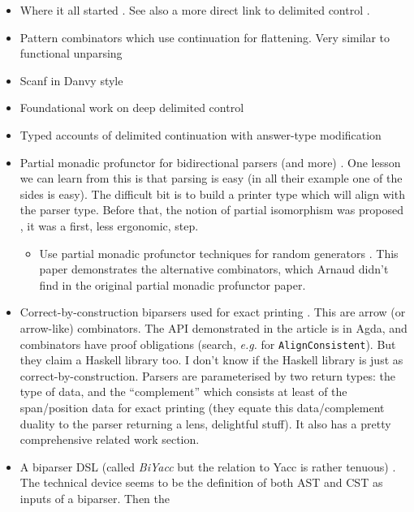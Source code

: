 \documentclass[sigplan,review,dvipsnames,screen,10pt]{acmart}
\begin{document}
\begin{itemize}
\item Where it all started \cite{functional-unparsing}. See also a
  more direct link to delimited control
  \cite{typed-functional-unparsing}.
\item Pattern combinators which use continuation for flattening. Very
  similar to functional unparsing \cite{pattern-combinators}
\item Scanf in Danvy style \cite{functional-ununparsing}
\item Foundational work on deep delimited control \cite{shift0}
\item Typed accounts of delimited continuation with answer-type
  modification \cite{polymorphic-conts,substructural-delimcc}
\item Partial monadic profunctor for bidirectional parsers (and more)
  \cite{monadic-profunctors}. One lesson we can learn from this is
  that parsing is easy (in all their example one of the sides is
  easy). The difficult bit is to build a printer type which will align
  with the parser type. Before that, the notion of partial isomorphism
  was proposed \cite{partial-isomorphism}, it was a first, less
  ergonomic, step.
  \begin{itemize}
  \item Use partial monadic profunctor techniques for random
    generators \cite{reflect-random}. This paper demonstrates the
    alternative combinators, which Arnaud didn't find in the original
    partial monadic profunctor paper.
  \end{itemize}
\item Correct-by-construction biparsers used for exact printing
  \cite{biparser-exact-print}. This are arrow (or arrow-like)
  combinators. The API demonstrated in the article is in Agda, and
  combinators have proof obligations (search, \emph{e.g.} for
  \verb+AlignConsistent+). But they claim a Haskell library too. I
  don't know if the Haskell library is just as
  correct-by-construction. Parsers are parameterised by two return
  types: the type of data, and the “complement” which consists at
  least of the span/position data for exact printing (they equate this
  data/complement duality to the parser returning a lens, delightful
  stuff). It also has a pretty comprehensive related work section.
\item A biparser DSL (called \emph{BiYacc} but the relation to Yacc is
  rather tenuous) \cite{biyacc}. The technical device seems to be the
  definition of both AST and CST as inputs of a biparser. Then the

\end{itemize}
\end{document}

